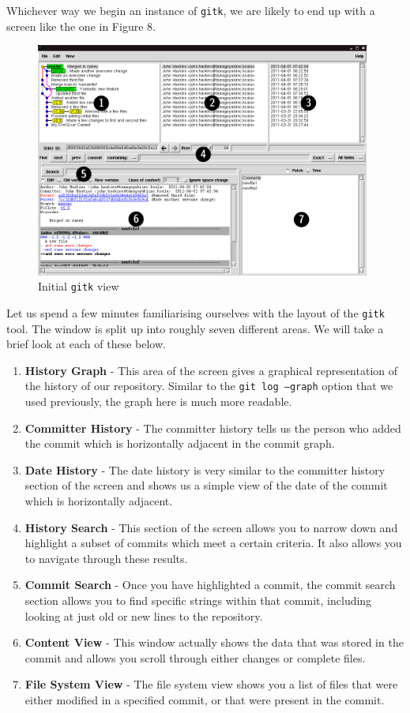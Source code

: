 Whichever way we begin an instance of \texttt{gitk}, we are likely to end up with a screen like the one in Figure 8.

\begin{figure}[hbt]
\centering
\includegraphics[width=11cm]{images/f-w5-d8.png}
\caption{Initial \texttt{gitk} view}
\end{figure}

Let us spend a few minutes familiarising ourselves with the layout of the \texttt{gitk} tool.
The window is split up into roughly seven different areas.
We will take a brief look at each of these below.

\begin{enumerate}
\item \textbf{History Graph} - This area of the screen gives a graphical representation of the history of our repository.
Similar to the \texttt{git log --graph} option that we used previously, the graph here is much more readable.
\item \textbf{Committer History} - The committer history tells us the person who added the commit which is horizontally adjacent in the commit graph.
\item \textbf{Date History} - The date history is very similar to the committer history section of the screen and shows us a simple view of the date of the commit which is horizontally adjacent.
\item \textbf{History Search} - This section of the screen allows you to narrow down and highlight a subset of commits which meet a certain criteria.
It also allows you to navigate through these results.
\item \textbf{Commit Search} - Once you have highlighted a commit, the commit search section allows you to find specific strings within that commit, including looking at just old or new lines to the repository.
\item \textbf{Content View} - This window actually shows the data that was stored in the commit and allows you scroll through either changes or complete files.
\item \textbf{File System View} - The file system view shows you a list of files that were either modified in a specified commit, or that were present in the commit.
\end{enumerate}

